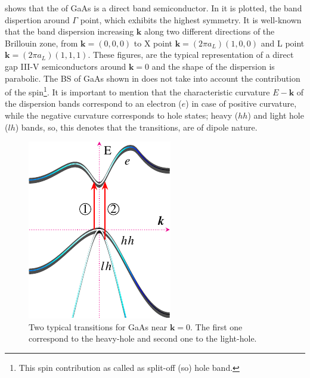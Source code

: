  shows that the of  GaAs is a direct band semiconductor. In  it is plotted, the band dispertion around $\Gamma$ point, which exhibits the highest symmetry.  It is well-known that the band dispersion increasing $\boldsymbol{k}$ along two different directions of the Brillouin zone, from $\boldsymbol{k}=(0,0,0)$ to X point $\boldsymbol{k}=(2\pi a_{L})(1,0,0)$ and L point $\boldsymbol{k}=(2\pi a_{L})(1,1,1)$. These figures, are the typical representation of a direct gap III-V semiconductors around  $\boldsymbol{k}=0$ and the shape of the dispersion is parabolic. The BS of GaAs shown in  does not take into account the contribution of the spin\footnote{This spin contribution as called as split-off (so) hole band.}.  It is important to mention that the characteristic curvature $E\!\!-\!\!\boldsymbol{k}$ of the dispersion bands correspond to an electron ($e$) in case of positive curvature, while the negative curvature corresponds to hole states; heavy ($hh$) and light hole ($lh$) bands, so, this denotes that the transitions, are of dipole nature\cite{fox2002optical,cardona2005fundamentals}. \\
\begin{figure}[h!]
	\centering
		\includegraphics[width=0.5\linewidth]{../figures/chapter-1/bands/build/bands02}
	\caption{Two typical transitions for GaAs near $\boldsymbol{k}=0$. The first one correspond to the heavy-hole and second one to the light-hole. }
	\label{fig:subsubsection-1.1.1-GaAsbands-2}
\end{figure}
